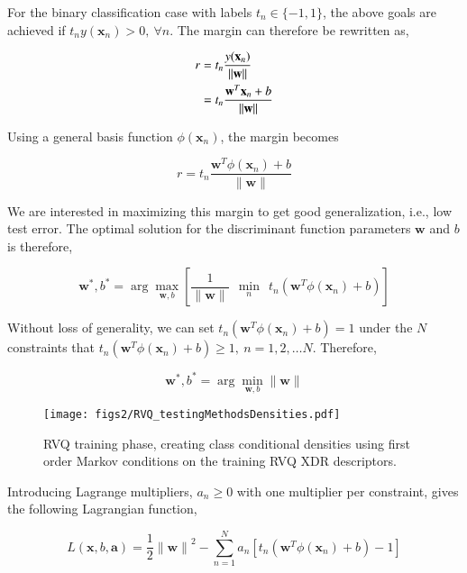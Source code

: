\begin{Body}
For the binary classification case with labels $t_n \in \{-1, 1\}$, the above goals are achieved if $t_ny(\mathbf{x}_n)>0, \ \forall n$.  The margin can therefore be rewritten as,

\begin{align}
r &= t_n\frac{y(\mathbf{x}_n)}{{\|\mathbf{w}\|}}\\\notag
&=t_n\frac{\mathbf{w}^T\mathbf{x}_n+b}{\|\mathbf{w}\|}
\end{align}

Using a general basis function $\phi(\mathbf{x}_n)$, the margin becomes

\begin{equation}
r = t_n\frac{\mathbf{w}^T\phi(\mathbf{x}_n)+b}{\|\mathbf{w}\|}
\end{equation}

We are interested in maximizing this margin to get good generalization, i.e., low test error.  The optimal solution for the discriminant function parameters $\mathbf{w}$ and $b$ is therefore,

\begin{equation}
\mathbf{w}^*, b^* = \arg \max_{\mathbf{w},b} \left[\frac{1}{{\|\mathbf{w}\|}}\ \ \min_n \ \ t_n\left(\mathbf{w}^T\phi(\mathbf{x}_n)+b\right)\right]
\end{equation}

Without loss of generality, we can set $t_n\left(\mathbf{w}^T\phi(\mathbf{x}_n)+b\right) = 1$ under the $N$ constraints that $t_n\left(\mathbf{w}^T\phi(\mathbf{x}_n)+b\right) \geq 1, \ n=1, 2, \ldots N$.  Therefore,  

\begin{equation}
\mathbf{w}^*, b^* = \arg \min_{\mathbf{w},b} {\|\mathbf{w}\|}
\end{equation}

											\begin{figure}[t]
											\centering
											\texttt{[image: figs2/RVQ\_testingMethodsDensities.pdf]}
											\caption{RVQ training phase, creating class conditional densities using first order Markov conditions on the training RVQ XDR descriptors.}
											\label{fig:RVQ_testingMethodsDensities}
											\end{figure}



Introducing Lagrange multipliers, $a_n \geq 0$ with one multiplier per constraint, gives the following Lagrangian function,

\begin{equation}
L(\mathbf{x}, b, \mathbf{a}) = \frac{1}{2}{\|\mathbf{w}\|}^2 - \sum\limits_{n=1}^N a_n \left[t_n\left(\mathbf{w}^T\phi(\mathbf{x}_n)+b\right)-1\right]
\label{Eqn:SVM_lagrange_function}
\end{equation}


\end{Body}
